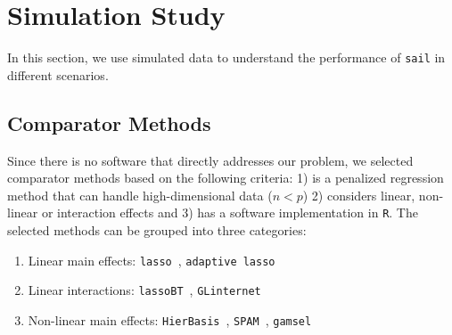 \documentclass[12pt,letter]{article}\usepackage[]{graphicx}\usepackage[]{color}
\makeatletter
\newcommand{\btheta}{\boldsymbol{\theta}}
\newcommand{\bPsi}{\boldsymbol{\Psi}}
\DeclareMathOperator*{\argmin}{arg\,min}
\DeclarePairedDelimiter\abs{\lvert}{\rvert}%
\DeclarePairedDelimiter\norm{\lVert}{\rVert}%
\let\oldabs\abs
\def\abs{\@ifstar{\oldabs}{\oldabs*}}
\let\oldnorm\norm
\def\norm{\@ifstar{\oldnorm}{\oldnorm*}}
\makeatother
\begin{document}

\section{Simulation Study}
In this section, we use simulated data to understand the performance of  \texttt{sail} in different scenarios. 

\subsection{Comparator Methods}

Since there is no software that directly addresses our problem, we selected comparator methods based on the following criteria: 1) is a penalized regression method that can handle high-dimensional data ($n<p$) 2) considers linear,  non-linear or interaction effects and 3) has a software implementation in \texttt{R}. The selected methods can be grouped into three categories:
\begin{enumerate}
	\item Linear main effects: \texttt{lasso}~\citep{tibshirani1996regression}, \texttt{adaptive lasso}~\citep{zou2006adaptive}
	\item Linear interactions: \texttt{lassoBT}~\citep{shah2016modelling}, \texttt{GLinternet}~\citep{lim2015learning}
	\item Non-linear main effects: \texttt{HierBasis}~\citep{haris2016nonparametric}, \texttt{SPAM}~\citep{ravikumar2009sparse}, \texttt{gamsel}~\citep{chouldechova2015generalized}
\end{enumerate}
\end{document}
